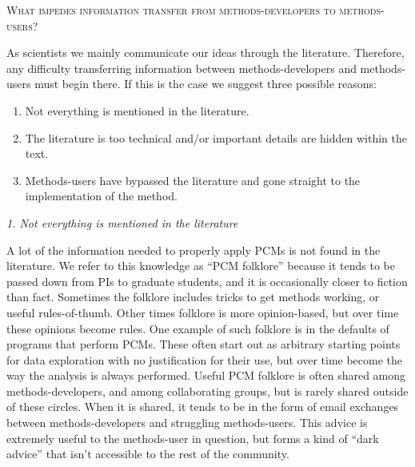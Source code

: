 \documentclass[a4paper,12pt]{article}
\renewcommand{\section}[1]{
  \bigskip
  \begin{center}
  \begin{Large}
  \normalfont\scshape #1
  \medskip
  \end{Large}
  \end{center}
}
\renewcommand{\subsection}[1]{
  \bigskip
  \begin{center}
  \begin{large}
  \normalfont\itshape #1
  \end{large}
  \end{center}
}
\begin{document}
\section{What impedes information transfer from methods-developers to methods-users?}
As scientists we mainly communicate our ideas through the literature. Therefore, any difficulty transferring information between methods-developers and methods-users must begin there. If this is the case we suggest three possible reasons:

\begin{enumerate}
\item Not everything is mentioned in the literature.
\item The literature is too technical and/or important details are hidden within the text.
\item Methods-users have bypassed the literature and gone straight to the implementation of the method.
\end{enumerate}


\subsection{1. Not everything is mentioned in the literature}
A lot of the information needed to properly apply PCMs is not found in the literature. 
We refer to this knowledge as ``PCM folklore'' because it tends to be passed down from PIs to graduate students, and it is occasionally closer to fiction than fact.
Sometimes the folklore includes tricks to get methods working, or useful rules-of-thumb. 
Other times folklore is more opinion-based, but over time these opinions become rules. 
One example of such folklore is in the defaults of programs that perform PCMs. 
These often start out as arbitrary starting points for data exploration with no justification for their use, but over time become the way the analysis is always performed.
Useful PCM folklore is often shared among methods-developers, and among collaborating groups, but is rarely shared outside of these circles. 
When it is shared, it tends to be in the form of email exchanges between methods-developers and struggling methods-users.
This advice is extremely useful to the methods-user in question, but forms a kind of ``dark advice'' that isn't accessible to the rest of the community.\\
\end{document}
